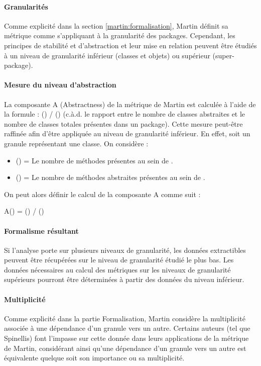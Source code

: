 \documentclass{scrartcl}
\begin{document}
    \paragraph{Granularités}Comme explicité dans la section \ref{martin:formalisation}, Martin définit sa métrique comme s'appliquant à la granularité des packages. Cependant, les principes de stabilité et d'abstraction et leur mise en relation peuvent être étudiés à un niveau de granularité inférieur (classes et objets) ou supérieur (super-package).
    
    \paragraph{Mesure du niveau d'abstraction}La composante A (Abstractness) de la métrique de Martin est calculée à l'aide de la formule : 
    \numberOfabstractClass{}(\granule{}) / {\numberOfClass{}(\granule{})} (c.à.d. le rapport entre le nombre de classes abstraites et le nombre de classes totales présentes dans un package). Cette mesure peut-être raffinée afin d'être appliquée au niveau de granularité inférieur. En effet, soit \granule{} un granule représentant une classe. On considère :
    \begin{itemize}
        \item \numberOfMethod{}(\granule{}{}) = Le nombre de méthodes présentes au sein de \granule{}.
        \item \numberOfabstractMethod{}(\granule{}) = Le nombre de méthodes abstraites présentes au sein de \granule{}.
    \end{itemize}
    On peut alors définir le calcul de la composante A comme suit :\\
    {\centering
        A(\granule{}) = \numberOfabstractMethod{}(\granule{}) / \numberOfMethod{}(\granule{}{})
    \par}
    
    \paragraph{Formalisme résultant}Si l'analyse porte sur plusieurs niveaux de granularité, les données extractibles peuvent être récupérées sur le niveau de granularité étudié le plus bas. Les données nécessaires au calcul des métriques sur les niveaux de granularité supérieurs pourront être déterminées à partir des données du niveau inférieur.
    
    \paragraph{Multiplicité}Comme explicité dans la partie Formalisation, Martin considère la multiplicité associée à une dépendance d'un granule vers un autre. Certains auteurs (tel que Spinellis\cite{Spinellis:2006}) font l'impasse sur cette donnée dans leurs applications de la métrique de Martin, considérant ainsi qu'une dépendance d'un granule vers un autre est équivalente quelque soit son importance ou sa multiplicité.
\end{document}
